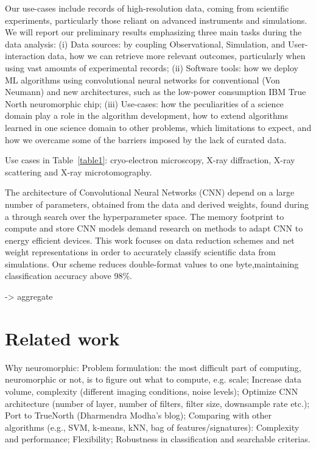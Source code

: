 Our use-cases include records of high-resolution data, coming from scientific experiments, particularly those reliant on advanced instruments and simulations. We will report our preliminary results emphasizing three main tasks during the data analysis:
(i) Data sources: by coupling Observational, Simulation, and User-interaction data, how we can retrieve more relevant outcomes, particularly when using vast amounts of experimental records; (ii) Software tools: how we deploy ML algorithms using convolutional neural networks for conventional (Von Neumann) and new architectures, such as the low-power consumption IBM True
North neuromorphic chip; (iii) Use-cases: how the peculiarities of a science domain play a role in the algorithm development, how to extend algorithms learned in one science domain to other problems, which limitations to expect, and how we overcame some of the barriers imposed by the lack of curated data.



Use cases in Table~\ref{table1}: cryo-electron microscopy, X-ray diffraction, X-ray scattering and X-ray microtomography.

The architecture of Convolutional Neural Networks (CNN) depend on a
large number of parameters, obtained from the data and derived weights,
found during a through search over the hyperparameter space. The
memory footprint to compute and store CNN models demand research
on methods to adapt CNN to energy efficient devices. This work focuses
on data reduction schemes and net weight representations in order to
accurately classify scientific data from simulations. Our scheme reduces
double-format values to one byte,maintaining classification accuracy
above 98\%.

-> aggregate



\section{Related work}
Why neuromorphic:
Problem formulation: the most difficult part of computing, neuromorphic or not, is to figure out what to compute, e.g. scale;
Increase data volume, complexity (different imaging conditions, noise levels);
Optimize CNN architecture (number of layer, number of filters, filter size, downsample rate etc.);
Port to TrueNorth (Dharmendra Modha’s blog);
Comparing with other algorithms (e.g., SVM, k-means, kNN, bag of features/signatures):
Complexity and performance;
Flexibility;
Robustness in classification and searchable criterias.
